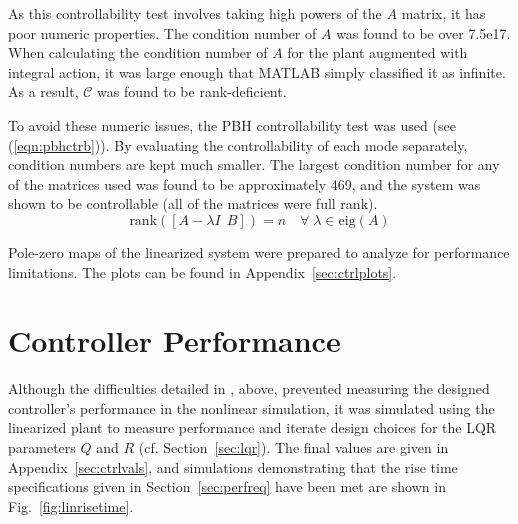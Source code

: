 \documentclass{sydeStyle}
\begin{document}
As this controllability test involves taking high powers of the $A$ matrix, it
has poor numeric properties.  The condition number of $A$ was found to be over
7.5e17.  When calculating the condition number of $A$ for the plant augmented
with integral action, it was large enough that MATLAB simply classified it as
infinite.  As a result, $\mathcal{C}$ was found to be rank-deficient.

To avoid these numeric issues, the PBH controllability test was used (see
(\ref{eqn:pbhctrb})).  By evaluating the controllability of each mode separately,
condition numbers are kept much smaller.  The largest condition number for any
of the matrices used was found to be approximately 469, and the system was shown
to be controllable (all of the matrices were full rank).
\begin{equation}
    \textrm{rank}([A - \lambda I \;\, B]) = n \quad \forall \; \lambda \in
    \textrm{eig}(A)
    \label{eqn:pbhctrb}
\end{equation}

Pole-zero maps of the linearized system were prepared to analyze for performance
limitations.  The plots can be found in Appendix~\ref{sec:ctrlplots}.

\section{Controller Performance}
Although the difficulties detailed in , above, prevented
measuring the designed controller's performance in the nonlinear simulation, it
was simulated using the linearized plant to measure performance and iterate
design choices for the LQR parameters $Q$ and $R$ (cf.  Section~\ref{sec:lqr}).
The final values are given in Appendix~\ref{sec:ctrlvals}, and simulations
demonstrating that the rise time specifications given in
Section~\ref{sec:perfreq} have been met are shown in Fig.~\ref{fig:linrisetime}.
\end{document}
